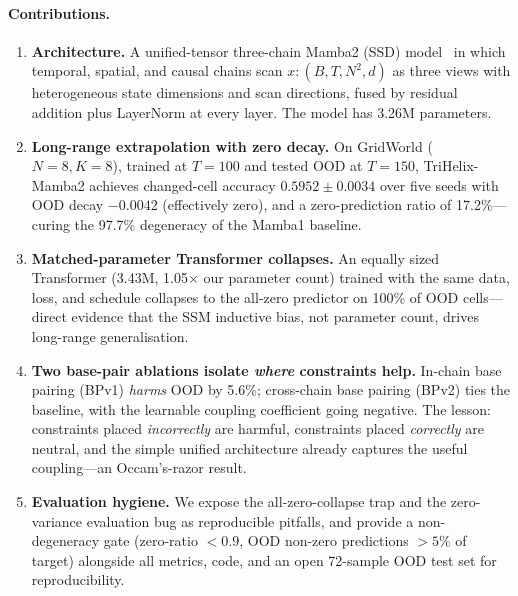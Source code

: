\paragraph{Contributions.}
\begin{enumerate}[leftmargin=*,itemsep=2pt]
  \item \textbf{Architecture.} A unified-tensor three-chain Mamba2 (SSD)
        model~\cite{mamba2,mamba} in which temporal, spatial, and causal chains
        scan $x{:}(B,T,N^{2},d)$ as three views with heterogeneous state
        dimensions and scan directions, fused by residual addition plus
        LayerNorm at every layer. The model has 3.26M parameters.
  \item \textbf{Long-range extrapolation with zero decay.} On GridWorld
        ($N{=}8, K{=}8$), trained at $T{=}100$ and tested OOD at $T{=}150$,
        TriHelix-Mamba2 achieves changed-cell accuracy $0.5952\pm0.0034$ over
        five seeds with OOD decay $-0.0042$ (effectively zero), and a
        zero-prediction ratio of 17.2\%---curing the 97.7\% degeneracy of the
        Mamba1 baseline.
  \item \textbf{Matched-parameter Transformer collapses.} An equally sized
        Transformer (3.43M, 1.05$\times$ our parameter count) trained with the
        same data, loss, and schedule collapses to the all-zero predictor on
        100\% of OOD cells---direct evidence that the SSM inductive bias, not
        parameter count, drives long-range generalisation.
  \item \textbf{Two base-pair ablations isolate \emph{where} constraints help.}
        In-chain base pairing (BPv1) \emph{harms} OOD by 5.6\%; cross-chain base
        pairing (BPv2) ties the baseline, with the learnable coupling
        coefficient going negative. The lesson: constraints placed
        \emph{incorrectly} are harmful, constraints placed \emph{correctly} are
        neutral, and the simple unified architecture already captures the
        useful coupling---an Occam's-razor result.
  \item \textbf{Evaluation hygiene.} We expose the all-zero-collapse trap and
        the zero-variance evaluation bug as reproducible pitfalls, and provide
        a non-degeneracy gate (zero-ratio $<0.9$, OOD non-zero predictions
        $>5\%$ of target) alongside all metrics, code, and an open 72-sample
        OOD test set for reproducibility.
\end{enumerate}

